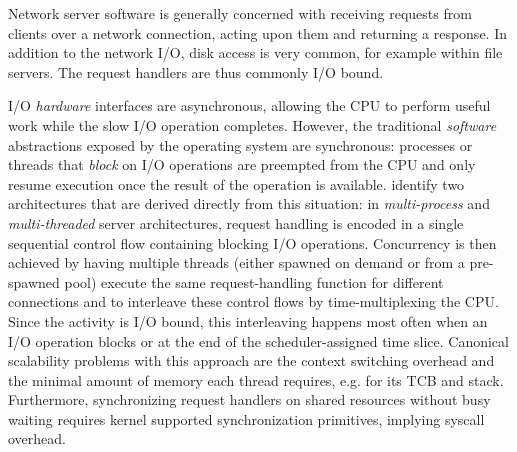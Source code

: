 \documentclass[12pt,a4paper]{book}
\begin{document}
%

Network server software is generally concerned with receiving requests from clients over a network connection, acting upon them and returning a response.
In addition to the network I/O, disk access is very common, for example within file servers.
The request handlers are thus commonly I/O bound.

I/O \emph{hardware} interfaces are asynchronous, allowing the CPU to perform useful work while the slow I/O operation completes.
However, the traditional \emph{software} abstractions exposed by the operating system are synchronous:
processes or threads that \emph{block} on I/O operations are preempted from the CPU and only resume execution once the result of the operation is available.
\citeauthor*{flashwebsrv} identify two architectures that are derived directly from this situation:
in \emph{multi-process} and \emph{multi-threaded} server architectures, request handling is encoded in a single sequential control flow containing blocking I/O operations.
Concurrency is then achieved by having multiple threads (either spawned on demand or from a pre-spawned pool) execute the same request-handling function for different connections and to interleave these control flows by time-multiplexing the CPU.
Since the activity is I/O bound, this interleaving happens most often when an I/O operation blocks or at the end of the scheduler-assigned time slice.
Canonical scalability problems with this approach are the context switching overhead and the minimal amount of memory each thread requires, e.g. for its TCB and stack.
Furthermore, synchronizing request handlers on shared resources without busy waiting requires kernel supported synchronization primitives, implying syscall overhead.~\cite{flashwebsrv,c10k,andersonThreads,seda}
\end{document}
